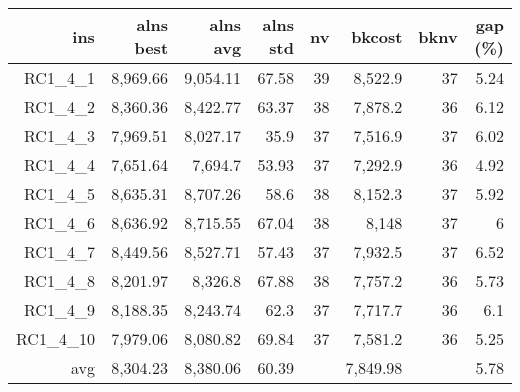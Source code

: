   \begin{table}[caption={Kết quả đo với tập HG\_RC\_1\_4 400 yêu cầu}, label=exp:HGRC14]
    \small
    \centering
    \begin{tabular}{rrrrrrrr}
    \hline
    ins & alns best & alns avg & alns std & nv & bkcost & bknv & gap (\%) \\ \hline
    RC1\_4\_1 & 8,969.66 & 9,054.11 & 67.58 & 39 & 8,522.9 & 37 & 5.24 \\ \hline
    RC1\_4\_2 & 8,360.36 & 8,422.77 & 63.37 & 38 & 7,878.2 & 36 & 6.12 \\ \hline
    RC1\_4\_3 & 7,969.51 & 8,027.17 & 35.9 & 37 & 7,516.9 & 37 & 6.02 \\ \hline
    RC1\_4\_4 & 7,651.64 & 7,694.7 & 53.93 & 37 & 7,292.9 & 36 & 4.92 \\ \hline
    RC1\_4\_5 & 8,635.31 & 8,707.26 & 58.6 & 38 & 8,152.3 & 37 & 5.92 \\ \hline
    RC1\_4\_6 & 8,636.92 & 8,715.55 & 67.04 & 38 & 8,148 & 37 & 6 \\ \hline
    RC1\_4\_7 & 8,449.56 & 8,527.71 & 57.43 & 37 & 7,932.5 & 37 & 6.52 \\ \hline
    RC1\_4\_8 & 8,201.97 & 8,326.8 & 67.88 & 38 & 7,757.2 & 36 & 5.73 \\ \hline
    RC1\_4\_9 & 8,188.35 & 8,243.74 & 62.3 & 37 & 7,717.7 & 36 & 6.1 \\ \hline
    RC1\_4\_10 & 7,979.06 & 8,080.82 & 69.84 & 37 & 7,581.2 & 36 & 5.25 \\ \hline
    avg & 8,304.23 & 8,380.06 & 60.39 & & 7,849.98 & & 5.78 \\ \hline
    \end{tabular}
  \end{table}


